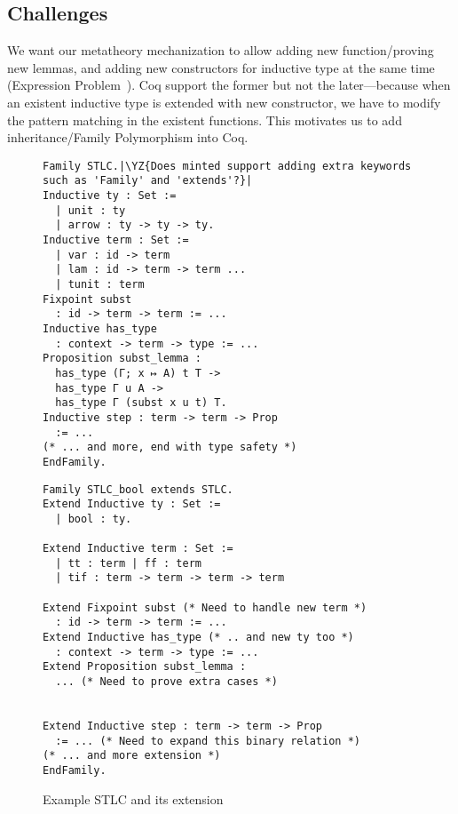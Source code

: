 \subsection{Challenges}

We want our metatheory mechanization to allow adding new function/proving new lemmas, and adding new constructors for inductive type at the same time  (Expression Problem~\cite{wadler-ep}). Coq support the former but not the later---because when an existent inductive type is extended with new constructor, we have to modify the pattern matching in the existent functions. This motivates us to add inheritance/Family Polymorphism into Coq. 

\begin{figure}[!htb]
  \begin{minipage}[t]{0.47\linewidth}
\begin{verbatim}
Family STLC.|\YZ{Does minted support adding extra keywords such as 'Family' and 'extends'?}|
Inductive ty : Set :=
  | unit : ty
  | arrow : ty -> ty -> ty.
Inductive term : Set := 
  | var : id -> term 
  | lam : id -> term -> term ...
  | tunit : term 
Fixpoint subst 
  : id -> term -> term := ...
Inductive has_type 
  : context -> term -> type := ...
Proposition subst_lemma :
  has_type (Γ; x ↦ A) t T ->
  has_type Γ u A ->
  has_type Γ (subst x u t) T.
Inductive step : term -> term -> Prop 
  := ...
(* ... and more, end with type safety *)
EndFamily.
\end{verbatim}
  \end{minipage}
  \begin{minipage}[t]{0.47\linewidth}
\begin{verbatim}
Family STLC_bool extends STLC.
Extend Inductive ty : Set :=
  | bool : ty.

Extend Inductive term : Set := 
  | tt : term | ff : term 
  | tif : term -> term -> term -> term

Extend Fixpoint subst (* Need to handle new term *)
  : id -> term -> term := ...
Extend Inductive has_type (* .. and new ty too *)
  : context -> term -> type := ...
Extend Proposition subst_lemma :
  ... (* Need to prove extra cases *)


Extend Inductive step : term -> term -> Prop 
  := ... (* Need to expand this binary relation *)
(* ... and more extension *)
EndFamily.
\end{verbatim}
  \end{minipage}
  \caption{Example STLC and its extension}\label{fig:STLC-example}
\end{figure}

